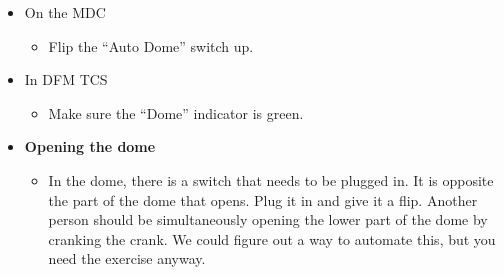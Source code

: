 \documentclass[letterpaper, 12pt]{report}
\begin{document}
\begin{itemize}
\begin{itemize}
\begin{itemize}
\begin{itemize}
						\end{itemize}
					\end{itemize}
					\begin{itemize}
						\item On the MDC
						\begin{itemize}
							\item Flip the ``Auto Dome'' switch up.
						\end{itemize}
					\end{itemize}
					\begin{itemize}
						\item In DFM TCS
						\begin{itemize}
							\item Make sure the ``Dome'' indicator is green.
						\end{itemize}
					\end{itemize}
				\end{itemize}
	\end{itemize}
\begin{itemize}
	\item \large \textbf{Opening the dome}
	\begin{itemize}
		\item In the dome, there is a switch that needs to be plugged in. It is opposite the part of the dome that opens. Plug it in and give it a flip. Another person should be simultaneously opening the lower part of the dome by cranking the crank. We could figure out a way to automate this, but you need the exercise anyway.
	\end{itemize}
\end{itemize}
\end{document}
